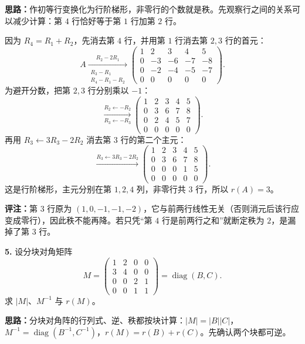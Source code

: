 \ifshowsolutions%
\textbf{思路：}作初等行变换化为行阶梯形，非零行的个数就是秩。先观察行之间的关系可以减少计算：第 \(4\) 行恰好等于第 \(1\) 行加第 \(2\) 行。

因为 \(R_4=R_1+R_2\)，先消去第 \(4\) 行，并用第 \(1\) 行消去第 \(2,3\) 行的首元：
\[
A\xrightarrow[\substack{R_3-R_1\\R_4-R_1-R_2}]{R_2-2R_1}
\begin{pmatrix}
1&2&3&4&5\\
0&-3&-6&-7&-8\\
0&-2&-4&-5&-7\\
0&0&0&0&0
\end{pmatrix}.
\]
为避开分数，把第 \(2,3\) 行分别乘以 \(-1\)：
\[
\xrightarrow[R_3\leftarrow -R_3]{R_2\leftarrow -R_2}
\begin{pmatrix}
1&2&3&4&5\\
0&3&6&7&8\\
0&2&4&5&7\\
0&0&0&0&0
\end{pmatrix}.
\]
再用 \(R_3\leftarrow 3R_3-2R_2\) 消去第 \(3\) 行的第二个主元：
\[
\xrightarrow{R_3\leftarrow 3R_3-2R_2}
\begin{pmatrix}
1&2&3&4&5\\
0&3&6&7&8\\
0&0&0&1&5\\
0&0&0&0&0
\end{pmatrix}.
\]
这是行阶梯形，主元分别在第 \(1,2,4\) 列，非零行共 \(3\) 行，所以 \(r(A)=3\)。

\textbf{评注：}第 \(3\) 行原为 \((1,0,-1,-1,-2)\)，它与前两行线性无关（否则消元后该行应变成零行），因此秩不能再降。若只凭“第 \(4\) 行是前两行之和”就断定秩为 \(2\)，是漏掉了第 \(3\) 行。

\else \answerarea[8] \fi%

\textbf{5.} 设分块对角矩阵
\[
M=\begin{pmatrix}
1&2&0&0\\
3&4&0&0\\
0&0&2&1\\
0&0&1&1
\end{pmatrix}
=\operatorname{diag}(B,C).
\]
求 \(|M|\)、\(M^{-1}\) 与 \(r(M)\)。

\ifshowsolutions%
\textbf{思路：}分块对角阵的行列式、逆、秩都按块计算：\(|M|=|B||C|\)，\(M^{-1}=\operatorname{diag}(B^{-1},C^{-1})\)，\(r(M)=r(B)+r(C)\)。先确认两个块都可逆。

